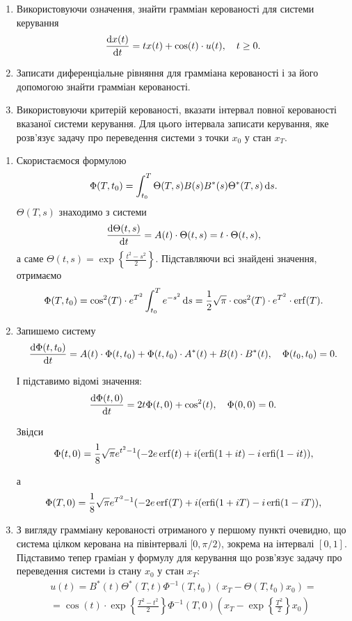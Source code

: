 \begin{problem}
	\begin{enumerate}
		\item Використовуючи означення, знайти грамміан керованості для системи керування \[ \frac{\mathop{}\!\mathrm{d} x(t)}{\mathop{}\!\mathrm{d} t} = t x (t) + \cos (t) \cdot u(t), \quad t \ge 0. \]

		\item Записати диференціальне рівняння для грамміана керованості і за його допомогою знайти грамміан керованості.

		\item Використовуючи критерій керованості, вказати інтервал повної керованості вказаної системи керування. Для цього інтервала записати керування, яке розв'язує задачу про переведення системи з точки $x_0$ у стан $x_T$.
	\end{enumerate}
\end{problem}

\begin{solution}
	\begin{enumerate}
		\item Скористаємося формулою \[\Phi(T, t_0) = \int_{t_0}^T \Theta(T, s) B(s) B^*(s) \Theta^*(T, s) \mathop{}\!\mathrm{d} s.\] $\Theta(T, s)$ знаходимо з системи \[ \frac{\mathop{}\!\mathrm{d} \Theta(t,s)}{\mathop{}\!\mathrm{d} t} = A(t) \cdot \Theta(t, s) = t \cdot \Theta(t, s),\] а саме $\Theta(t, s) = \exp\left\{\frac{t^2 - s^2}{2}\right\}$. Підставляючи всі знайдені значення, отримаємо \[\Phi(T, t_0) = \cos^2(T) \cdot e^{T^2} \int_{t_0}^T e^{-s^2} \mathop{}\!\mathrm{d} s = \frac{1}{2} \sqrt{\pi} \cdot \cos^2(T) \cdot e^{T^2} \cdot \operatorname{erf}(T).\]

		\item Запишемо систему \[ \frac{\mathop{}\!\mathrm{d} \Phi (t, t_0)}{\mathop{}\!\mathrm{d} t} = A(t) \cdot \Phi(t, t_0) + \Phi(t, t_0) \cdot A^*(t) + B(t) \cdot B^*(t), \quad \Phi(t_0, t_0) = 0. \]

		І підставимо відомі значення: \[ \frac{\mathop{}\!\mathrm{d} \Phi (t, 0)}{\mathop{}\!\mathrm{d} t} = 2 t \Phi(t, 0)  + \cos^2(t), \quad \Phi(0, 0) = 0. \]

		Звідси \[ \Phi(t, 0) = \frac{1}{8} \sqrt{\pi} e^{t^2 - 1} ( - 2 e \operatorname{erf}(t) + i (\operatorname{erfi}(1 + i t) - i \operatorname{erfi}(1 - i t)), \]

		а \[ \Phi(T, 0) = \frac{1}{8} \sqrt{\pi} e^{T^2 - 1} ( - 2 e \operatorname{erf}(T) + i (\operatorname{erfi}(1 + i T) - i \operatorname{erfi}(1 - i T)), \]

		\item З вигляду грамміану керованості отриманого у першому пункті очевидно, що система цілком керована на півінтервалі $[0, \pi / 2)$, зокрема на інтервалі $[0, 1]$. \\

		Підставимо тепер граміан у формулу для керування що розв'язує задачу про переведення системи із стану $x_0$ у стан $x_T$:
		\begin{multline*} u(t) = B^*(t) \Theta^*(T, t) \Phi^{-1}(T, t_0) (x_T - \Theta(T, t_0) x_0) = \\ = \cos(t) \cdot \exp\left\{\frac{T^2-t^2}{2}\right\} \Phi^{-1} (T, 0) \left(x_T - \exp\left\{\frac{T^2}{2}\right\} x_0\right) \end{multline*}
	\end{enumerate}
\end{solution}

